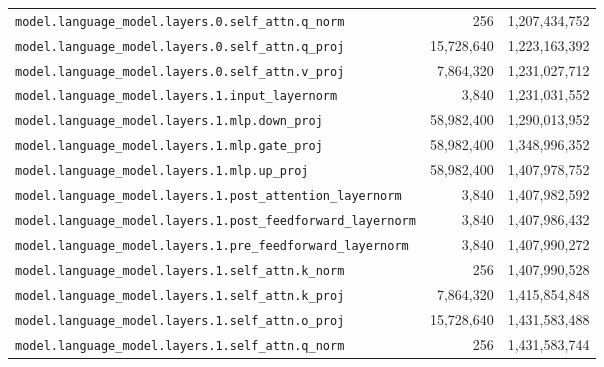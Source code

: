 \documentclass[10pt,a4paper]{article}
\theoremstyle{definition}
\begin{document}
\begin{appendices}
\begin{longtable}{p{9.5cm}rr}
\texttt{model.\allowbreak{}language\_model.\allowbreak{}layers.\allowbreak{}0.\allowbreak{}self\_attn.\allowbreak{}q\_norm} & 256 & 1,207,434,752 \\
\texttt{model.\allowbreak{}language\_model.\allowbreak{}layers.\allowbreak{}0.\allowbreak{}self\_attn.\allowbreak{}q\_proj} & 15,728,640 & 1,223,163,392 \\
\texttt{model.\allowbreak{}language\_model.\allowbreak{}layers.\allowbreak{}0.\allowbreak{}self\_attn.\allowbreak{}v\_proj} & 7,864,320 & 1,231,027,712 \\
\texttt{model.\allowbreak{}language\_model.\allowbreak{}layers.\allowbreak{}1.\allowbreak{}input\_layernorm} & 3,840 & 1,231,031,552 \\
\texttt{model.\allowbreak{}language\_model.\allowbreak{}layers.\allowbreak{}1.\allowbreak{}mlp.\allowbreak{}down\_proj} & 58,982,400 & 1,290,013,952 \\
\texttt{model.\allowbreak{}language\_model.\allowbreak{}layers.\allowbreak{}1.\allowbreak{}mlp.\allowbreak{}gate\_proj} & 58,982,400 & 1,348,996,352 \\
\texttt{model.\allowbreak{}language\_model.\allowbreak{}layers.\allowbreak{}1.\allowbreak{}mlp.\allowbreak{}up\_proj} & 58,982,400 & 1,407,978,752 \\
\texttt{model.\allowbreak{}language\_model.\allowbreak{}layers.\allowbreak{}1.\allowbreak{}post\_attention\_layernorm} & 3,840 & 1,407,982,592 \\
\texttt{model.\allowbreak{}language\_model.\allowbreak{}layers.\allowbreak{}1.\allowbreak{}post\_feedforward\_layernorm} & 3,840 & 1,407,986,432 \\
\texttt{model.\allowbreak{}language\_model.\allowbreak{}layers.\allowbreak{}1.\allowbreak{}pre\_feedforward\_layernorm} & 3,840 & 1,407,990,272 \\
\texttt{model.\allowbreak{}language\_model.\allowbreak{}layers.\allowbreak{}1.\allowbreak{}self\_attn.\allowbreak{}k\_norm} & 256 & 1,407,990,528 \\
\texttt{model.\allowbreak{}language\_model.\allowbreak{}layers.\allowbreak{}1.\allowbreak{}self\_attn.\allowbreak{}k\_proj} & 7,864,320 & 1,415,854,848 \\
\texttt{model.\allowbreak{}language\_model.\allowbreak{}layers.\allowbreak{}1.\allowbreak{}self\_attn.\allowbreak{}o\_proj} & 15,728,640 & 1,431,583,488 \\
\texttt{model.\allowbreak{}language\_model.\allowbreak{}layers.\allowbreak{}1.\allowbreak{}self\_attn.\allowbreak{}q\_norm} & 256 & 1,431,583,744 \\

\end{longtable}
\end{appendices}
\end{document}
